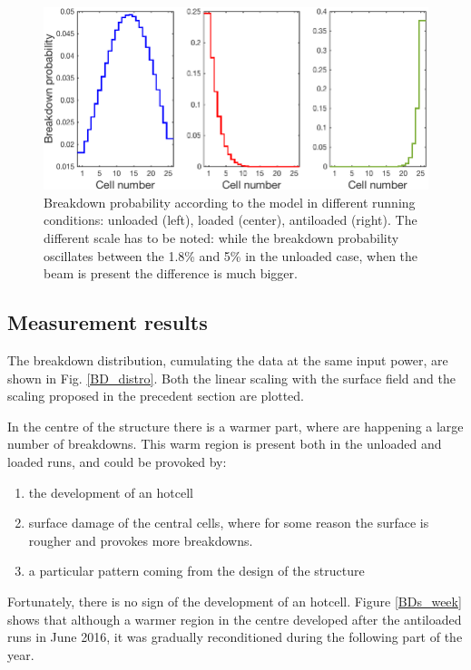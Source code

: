 \begin{figure}[h]
\centering 
\includegraphics[scale=0.45]{pictures/BD_probability.png}
\caption{Breakdown probability according to the model in different running conditions: unloaded (left), loaded (center), antiloaded (right). The different scale has to be noted: while the breakdown probability oscillates between the 1.8\% and 5\% in the unloaded case, when the beam is present the difference is much bigger.}
\label{BD_prob}
\end{figure}


\subsection[Measurement results]{Measurement results}

The breakdown distribution, cumulating the data at the same input power, are shown in Fig. \ref{BD_distro}. Both the linear scaling with the surface field and the scaling proposed in the precedent section are plotted.

In the centre of the structure there is a warmer part, where are happening a large number of breakdowns. This warm region is present both in the unloaded and loaded runs, and could be provoked by: 
\begin{enumerate}
\item the development of an hotcell
\item surface damage of the central cells, where for some reason the surface is rougher and provokes more breakdowns. 
\item a particular pattern coming from the design of the structure
\end{enumerate}
Fortunately, there is no sign of the development of an hotcell. Figure \ref{BDs_week} shows that although a warmer region in the centre developed after the antiloaded runs in June 2016, it was gradually reconditioned during the following part of the year. 

